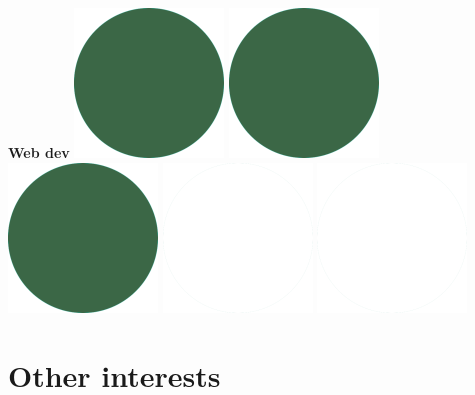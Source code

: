 \documentclass[]{commands}
\begin{document}
\begin{aside}
\textbf{Web dev}\hfill
\includegraphics[scale=0.11]{img/IPSGreenDots.png}
\includegraphics[scale=0.11]{img/IPSGreenDots.png}
\includegraphics[scale=0.11]{img/IPSGreenDots.png}
\includegraphics[scale=0.11]{img/WhiteDots.png}
\includegraphics[scale=0.11]{img/WhiteDots.png}

\vspace{3.5mm}
\section{Other interests}
\vspace{3.5mm}


\end{aside}
\end{document}

